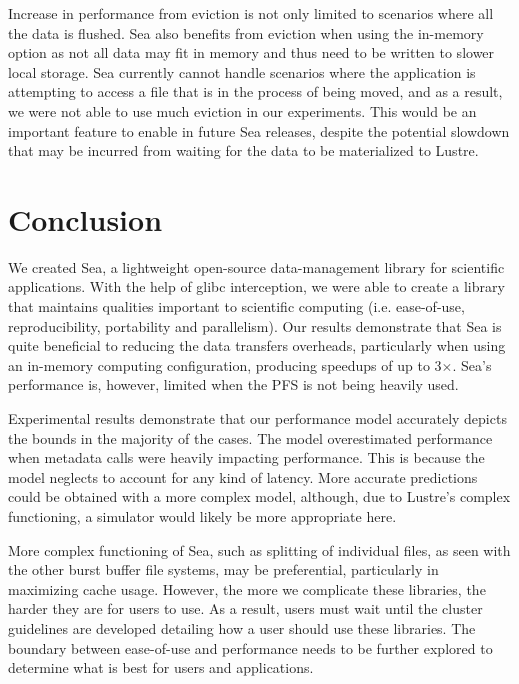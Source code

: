 \documentclass[10pt,journal,compsoc]{IEEEtran}
\begin{document}
    Increase in performance from eviction is not only limited to scenarios where
    all the data is flushed. Sea also benefits from eviction when using the
    in-memory option as not all data may fit in memory and thus need to be
    written to slower local storage. Sea currently cannot handle scenarios where
    the application is attempting to access a file that is in the process of
    being moved, and as a result, we were not able to use much eviction in our
    experiments. This would be an important feature to enable in future Sea
    releases, despite the potential slowdown that may be incurred from waiting
    for the data to be materialized to Lustre.

\section{Conclusion}
    We created Sea, a lightweight open-source data-management library for
    scientific applications. With the help of glibc interception, we were able
    to create a library that maintains qualities important to scientific
    computing (i.e. ease-of-use, reproducibility, portability and parallelism).
    Our results demonstrate that Sea is quite beneficial to reducing the data
    transfers overheads, particularly when using an in-memory computing
    configuration, producing speedups of up to 3$\times$. Sea's performance is,
    however, limited when the PFS is not being heavily used.

    Experimental results demonstrate that our performance model accurately
    depicts the bounds in the majority of the cases. The model overestimated
    performance when metadata calls were heavily impacting performance. This is
    because the model neglects to account for any kind of latency. More accurate
    predictions could be obtained with a more complex model, although, due to
    Lustre's complex functioning, a simulator would likely be more appropriate
    here.

    More complex functioning of Sea, such as splitting of individual files, as
    seen with the other burst buffer file systems, may be preferential,
    particularly in maximizing cache usage. However, the more we complicate
    these libraries, the harder they are for users to use. As a result, users
    must wait until the cluster guidelines are developed detailing how a user
    should use these libraries. The boundary between ease-of-use and performance
    needs to be further explored to determine what is best for users and
    applications.
\end{document}
